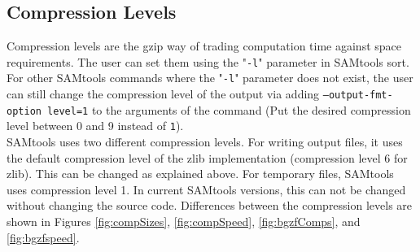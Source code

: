 \subsection{Compression Levels}
Compression levels are the gzip way of trading computation time against space requirements. The user can set them using the "\texttt{-l}" parameter in SAMtools sort. For other SAMtools commands where the "\texttt{-l}" parameter does not exist, the user can still change the compression level of the output via adding \texttt{--output-fmt-option level=1} to the arguments of the command (Put the desired compression level between 0 and 9 instead of \texttt{1}). \\
SAMtools uses two different compression levels. For writing output files, it uses the default compression level of the zlib implementation (compression level 6 for zlib). This can be changed as explained above. For temporary files, SAMtools uses compression level 1. In current SAMtools versions, this can not be changed without changing the source code.
Differences between the compression levels are shown in Figures \ref{fig:compSizes}, \ref{fig:compSpeed}, \ref{fig:bgzfComps}, and \ref{fig:bgzfspeed}.

